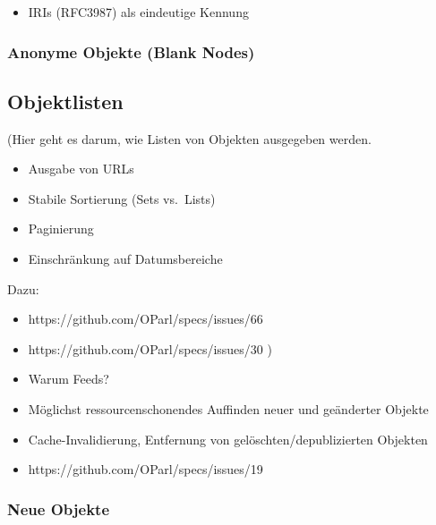 \documentclass[,a4paper]{article}
\begin{document}
\begin{itemize}
\item
  IRIs (RFC3987) als eindeutige Kennung
\end{itemize}

\subsubsection{Anonyme Objekte (Blank Nodes)}

\subsection{Objektlisten}

(Hier geht es darum, wie Listen von Objekten ausgegeben werden.

\begin{itemize}
\item
  Ausgabe von URLs
\item
  Stabile Sortierung (Sets vs.~Lists)
\item
  Paginierung
\item
  Einschränkung auf Datumsbereiche
\end{itemize}

Dazu:

\begin{itemize}
\item
  https://github.com/OParl/specs/issues/66
\item
  https://github.com/OParl/specs/issues/30 )
\end{itemize}


\begin{itemize}
\item
  Warum Feeds?
\item
  Möglichst ressourcenschonendes Auffinden neuer und geänderter Objekte
\item
  Cache-Invalidierung, Entfernung von gelöschten/depublizierten Objekten
\item
  https://github.com/OParl/specs/issues/19
\end{itemize}

\subsubsection{Neue Objekte}
\end{document}
